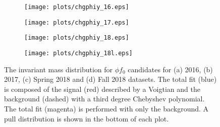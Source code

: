 \begin{center}
\null
\vfill
\begin{figure}[H]
    \centering
    \begin{subfigure}[b]{0.49\textwidth}
        \texttt{[image: plots/chgphiy\_16.eps]}
        \caption{}
        \label{fig.y2175.xsec_ul.yphifo.1.a}
    \end{subfigure}
    \begin{subfigure}[b]{0.49\textwidth}
        \texttt{[image: plots/chgphiy\_17.eps]}
        \caption{}
        \label{fig.y2175.xsec_ul.yphifo.1.b}
    \end{subfigure}
    \begin{subfigure}[b]{0.49\textwidth}
        \texttt{[image: plots/chgphiy\_18.eps]}
        \caption{}
        \label{fig.y2175.xsec_ul.yphifo.1.c}
    \end{subfigure}
    \begin{subfigure}[b]{0.49\textwidth}
        \texttt{[image: plots/chgphiy\_18l.eps]}
        \caption{}
        \label{fig.y2175.xsec_ul.yphifo.1.d}
    \end{subfigure}
    \caption{The invariant mass distribution for $\phi f_0$ candidates for (a) 2016, (b) 2017, (c) Spring 2018 and (d) Fall 2018 datasets. The total fit (blue) is composed of the signal (red) described by a Voigtian and the background (dashed) with a third degree Chebyshev polynomial. The total fit (magenta) is performed with only the background. A pull distribution is shown in the bottom of each plot.}
    \label{fig.y2175.xsec_ul.yphifo.1}
\end{figure}
\null
\vfill
\end{center}

